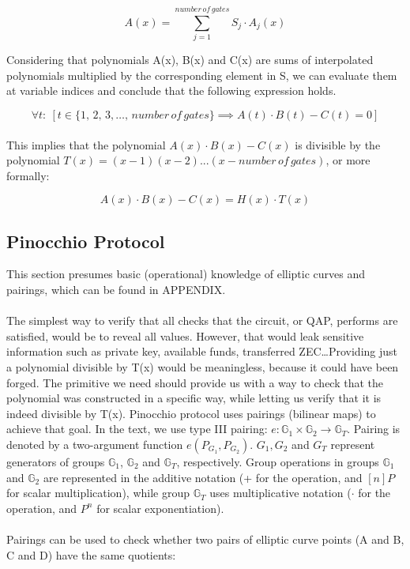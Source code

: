 $$ A(x) = \sum_{j = 1}^{number\,of\,gates} S_j \cdot A_j(x) $$

Considering that polynomials A(x), B(x) and C(x) are sums of interpolated polynomials multiplied by the corresponding element in S, we can evaluate them at variable indices and conclude that the following expression holds.

$$\forall t:\: [t \in \{1,\,2,\,3, \dots ,\,number\,of\,gates\} \implies A(t) \cdot B(t) - C(t) = 0]$$
\\
This implies that the polynomial $A(x) \cdot B(x) - C(x)$ is divisible by the polynomial $T(x) = (x-1)(x-2)...(x-number\,of\,gates)$, or more formally:

$$ A(x) \cdot B(x) - C(x) = H(x) \cdot T(x) $$

\subsection{Pinocchio Protocol}

This section presumes basic (operational) knowledge of elliptic curves and pairings, which can be found in APPENDIX.\\
\\
The simplest way to verify that all checks that the circuit, or QAP, performs are satisfied, would be to reveal all values. However, that would leak sensitive information such as private key, available funds, transferred ZEC\dots Providing just a polynomial divisible by T(x) would be meaningless, because it could have been forged. The primitive we need should provide us with a way to check that the polynomial was constructed in a specific way, while letting us verify that it is indeed divisible by T(x). Pinocchio protocol uses  pairings (bilinear maps) to achieve that goal. In the text, we use type III pairing: $e: \mathbb{G}_1 \times \mathbb{G}_2 \to \mathbb{G}_T$. Pairing is denoted by a two-argument function $e(P_{G_1}, P_{G_2})$. $G_1, G_2$ and $G_T$ represent generators of groups $\mathbb{G}_1$, $\mathbb{G}_2$ and $\mathbb{G}_T$, respectively. Group operations in groups $\mathbb{G}_1$ and $\mathbb{G}_2$ are represented in the additive notation (+ for the operation, and $[n]P$ for scalar multiplication), while group $\mathbb{G}_T$ uses multiplicative notation ($\cdot$ for the operation, and $P^n$ for scalar exponentiation).\\
\\
Pairings can be used to check whether two pairs of elliptic curve points (A and B, C and D) have the same quotients:

